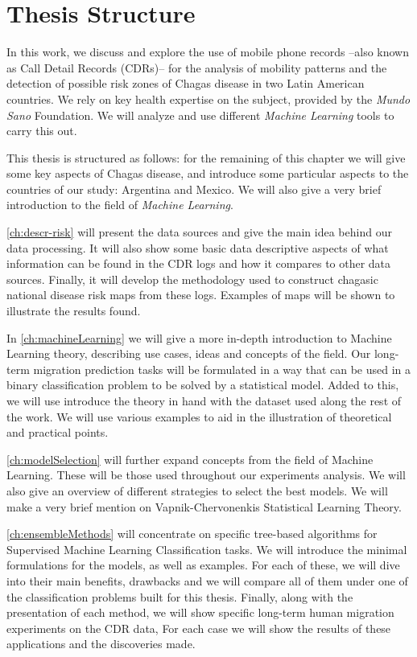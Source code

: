 \section{Thesis Structure}

In this work, we discuss and explore the use of mobile phone records --also known as Call Detail Records (CDRs)-- for the analysis of mobility patterns and the detection of possible risk zones of Chagas disease in two Latin American countries. 
We rely on key health expertise on the subject, provided by the \textit{Mundo Sano} Foundation. 
We will analyze and use different \textit{Machine Learning} tools to carry this out.

This thesis is structured as follows: for the remaining of this chapter we will give some key aspects of Chagas disease, and introduce some particular aspects to the countries of our study: Argentina and Mexico. We will also give a very brief introduction to the field of \textit{Machine Learning}.


\cref{ch:descr-risk} will present the data sources and give the main idea behind our data processing. 
It will also show some basic data descriptive aspects of what information can be found in the CDR logs and how it compares to other data sources.
Finally, it will develop the methodology used to construct chagasic national disease risk maps from these logs.
Examples of maps will be shown to illustrate the results found.

In \cref{ch:machineLearning} we will give a more in-depth introduction to Machine Learning theory, describing use cases, ideas and concepts of the field.
Our long-term migration prediction tasks will be formulated in a way that can be used in a binary classification problem to be solved by a statistical model.
Added to this, we will use introduce the theory in hand with the dataset used along the rest of the work. 
We will use various examples to aid in the illustration of theoretical and practical points.

\cref{ch:modelSelection} will further expand concepts from the field of Machine Learning.
These will be those used throughout our experiments analysis.
We will also give an overview of different strategies to select the best models.
We will make a very brief mention on Vapnik-Chervonenkis Statistical Learning Theory.

\cref{ch:ensembleMethods} will concentrate on specific tree-based algorithms for Supervised Machine Learning Classification tasks.
We will introduce the minimal formulations for the models, as well as examples.
For each of these, we will dive into their main benefits, drawbacks and we will compare all of them under one of the classification problems built for this thesis.
Finally, along with the presentation of each method, we will show specific long-term human migration experiments on the CDR data,
For each case we will show the results of these applications and the discoveries made.

